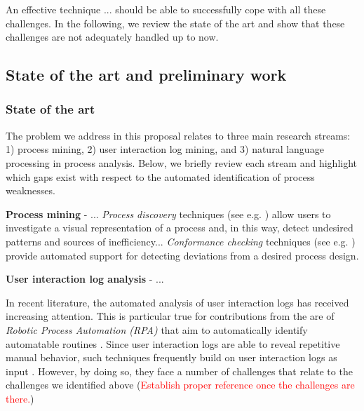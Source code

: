 \documentclass{scrartcl}
\newcommand\todo[1]{\textcolor{red}{#1}}
\begin{document}
An effective technique ... should be able to successfully cope with all these challenges. In the following, we review the state of the art and show that these challenges are not adequately handled up to now.

\subsection{State of the art and preliminary work}

\subsubsection{State of the art}

The problem we address in this proposal relates to three main research streams: 1) process mining, 2) user interaction log mining, and 3) natural language processing in process analysis. Below, we briefly review each stream and highlight which gaps exist with respect to the automated identification of process weaknesses.  

\textbf{Process mining} - ...  \textit{Process discovery} techniques (see e.g. \cite{gunther2007fuzzy,weijters2011flexible,leemans2013discovering}) allow users to investigate a visual representation of a process and, in this way, detect undesired patterns and sources of inefficiency... \textit{Conformance checking} techniques (see e.g. \cite{rozinat2008conformance,adriansyah2011conformance}) provide automated support for detecting deviations from a desired process design. 



\textbf{User interaction log analysis} - ...

In recent literature, the automated analysis of user interaction logs has received increasing attention. This is particular true for contributions from the are of \textit{Robotic Process Automation (RPA)} that aim to automatically identify automatable routines \cite{}. Since user interaction logs are able to reveal repetitive manual behavior, such techniques frequently build on user interaction logs as input \cite{}. However, by doing so, they face a number of challenges that relate to the challenges we identified above (\todo{Establish proper reference once the challenges are there.})  
\end{document}
